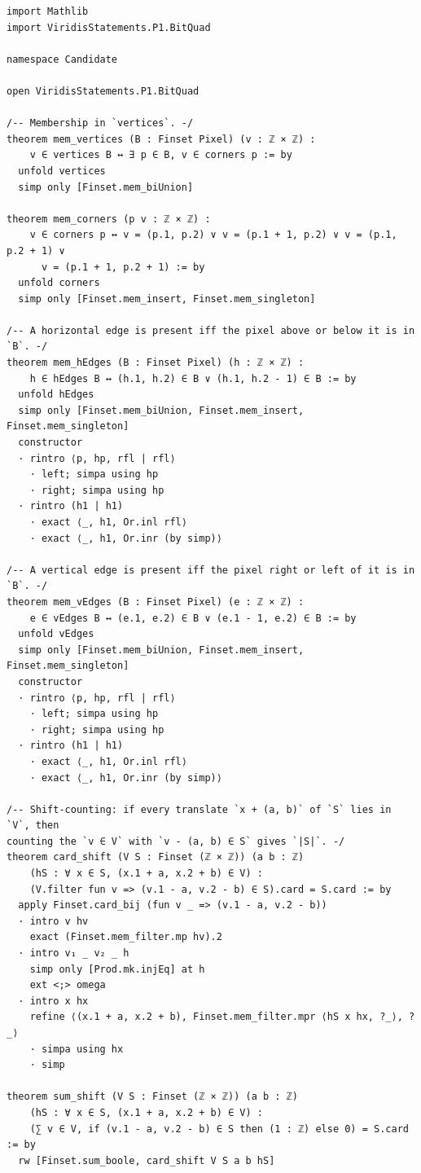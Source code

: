 \documentclass[11pt]{article}
\theoremstyle{definition}
\theoremstyle{remark}
\begin{document}
\begin{lstlisting}
import Mathlib
import ViridisStatements.P1.BitQuad

namespace Candidate

open ViridisStatements.P1.BitQuad

/-- Membership in `vertices`. -/
theorem mem_vertices (B : Finset Pixel) (v : ℤ × ℤ) :
    v ∈ vertices B ↔ ∃ p ∈ B, v ∈ corners p := by
  unfold vertices
  simp only [Finset.mem_biUnion]

theorem mem_corners (p v : ℤ × ℤ) :
    v ∈ corners p ↔ v = (p.1, p.2) ∨ v = (p.1 + 1, p.2) ∨ v = (p.1, p.2 + 1) ∨
      v = (p.1 + 1, p.2 + 1) := by
  unfold corners
  simp only [Finset.mem_insert, Finset.mem_singleton]

/-- A horizontal edge is present iff the pixel above or below it is in `B`. -/
theorem mem_hEdges (B : Finset Pixel) (h : ℤ × ℤ) :
    h ∈ hEdges B ↔ (h.1, h.2) ∈ B ∨ (h.1, h.2 - 1) ∈ B := by
  unfold hEdges
  simp only [Finset.mem_biUnion, Finset.mem_insert, Finset.mem_singleton]
  constructor
  · rintro ⟨p, hp, rfl | rfl⟩
    · left; simpa using hp
    · right; simpa using hp
  · rintro (h1 | h1)
    · exact ⟨_, h1, Or.inl rfl⟩
    · exact ⟨_, h1, Or.inr (by simp)⟩

/-- A vertical edge is present iff the pixel right or left of it is in `B`. -/
theorem mem_vEdges (B : Finset Pixel) (e : ℤ × ℤ) :
    e ∈ vEdges B ↔ (e.1, e.2) ∈ B ∨ (e.1 - 1, e.2) ∈ B := by
  unfold vEdges
  simp only [Finset.mem_biUnion, Finset.mem_insert, Finset.mem_singleton]
  constructor
  · rintro ⟨p, hp, rfl | rfl⟩
    · left; simpa using hp
    · right; simpa using hp
  · rintro (h1 | h1)
    · exact ⟨_, h1, Or.inl rfl⟩
    · exact ⟨_, h1, Or.inr (by simp)⟩

/-- Shift-counting: if every translate `x + (a, b)` of `S` lies in `V`, then
counting the `v ∈ V` with `v - (a, b) ∈ S` gives `|S|`. -/
theorem card_shift (V S : Finset (ℤ × ℤ)) (a b : ℤ)
    (hS : ∀ x ∈ S, (x.1 + a, x.2 + b) ∈ V) :
    (V.filter fun v => (v.1 - a, v.2 - b) ∈ S).card = S.card := by
  apply Finset.card_bij (fun v _ => (v.1 - a, v.2 - b))
  · intro v hv
    exact (Finset.mem_filter.mp hv).2
  · intro v₁ _ v₂ _ h
    simp only [Prod.mk.injEq] at h
    ext <;> omega
  · intro x hx
    refine ⟨(x.1 + a, x.2 + b), Finset.mem_filter.mpr ⟨hS x hx, ?_⟩, ?_⟩
    · simpa using hx
    · simp

theorem sum_shift (V S : Finset (ℤ × ℤ)) (a b : ℤ)
    (hS : ∀ x ∈ S, (x.1 + a, x.2 + b) ∈ V) :
    (∑ v ∈ V, if (v.1 - a, v.2 - b) ∈ S then (1 : ℤ) else 0) = S.card := by
  rw [Finset.sum_boole, card_shift V S a b hS]


\end{lstlisting}
\end{document}
